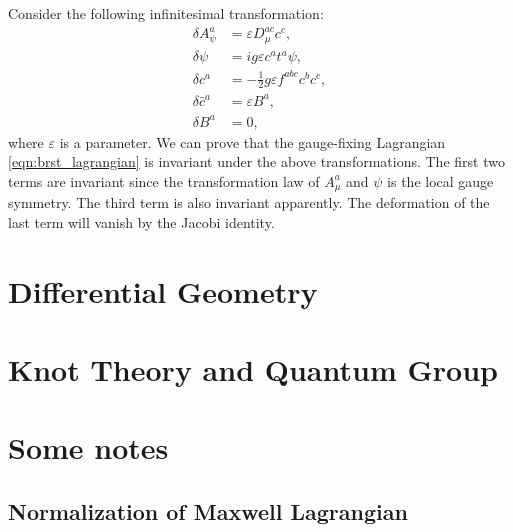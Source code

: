 \documentclass[a4paper,pdftex,draft]{report}
\begin{document}
Consider the following infinitesimal transformation:
\begin{align}
  \delta A_{\psi}^{a}
  &=
  \varepsilon D_{\mu}^{ac}c^{c}
  ,
  \\
  \delta\psi
  &=
  ig\varepsilon c^{a}t^{a}\psi
  ,
  \\
  \delta c^{a}
  &=
  -
  \frac{1}{2}g\varepsilon f^{abc}c^{b}c^{c}
  ,
  \\
  \delta \bar{c}^{a}
  &=
  \varepsilon B^{a}
  ,
  \\
  \delta B^{a}
  &=
  0
  ,
\end{align}
where $\varepsilon$ is a parameter. We can prove that the gauge-fixing Lagrangian \eqref{eqn:brst_lagrangian} is invariant under the above transformations. The first two terms are invariant since the transformation law of $A_{\mu}^{a}$ and $\psi$ is the local gauge symmetry. The third term is also invariant apparently. The deformation of the last term will vanish by the Jacobi identity.














  

\clearpage
\chapter{Differential Geometry}











\clearpage
\chapter{Knot Theory and Quantum Group}











\clearpage
\appendix
\chapter{Some notes}

\section{Normalization of Maxwell Lagrangian}
\end{document}
